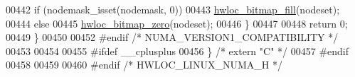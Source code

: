 \begin{DoxyCode}
00442     \textcolor{keywordflow}{if} (nodemask\_isset(nodemask, 0))
00443       \hyperlink{a00065_ga52456f7ef79d68e610cb65e3f7ffafad}{hwloc_bitmap_fill}(nodeset);
00444     \textcolor{keywordflow}{else}
00445       \hyperlink{a00065_ga6c540b9fe63b8223b6aba46d56dd63b8}{hwloc_bitmap_zero}(nodeset);
00446   \}
00447 
00448   \textcolor{keywordflow}{return} 0;
00449 \}
00450 
00452 \textcolor{preprocessor}{#endif }\textcolor{comment}{/* NUMA\_VERSION1\_COMPATIBILITY */}
00453 
00454 
00455 \textcolor{preprocessor}{#ifdef \_\_cplusplus}
00456 \textcolor{preprocessor}{}\} \textcolor{comment}{/* extern "C" */}
00457 \textcolor{preprocessor}{#endif}
00458 \textcolor{preprocessor}{}
00459 
00460 \textcolor{preprocessor}{#endif }\textcolor{comment}{/* HWLOC\_LINUX\_NUMA\_H */}
\end{DoxyCode}
